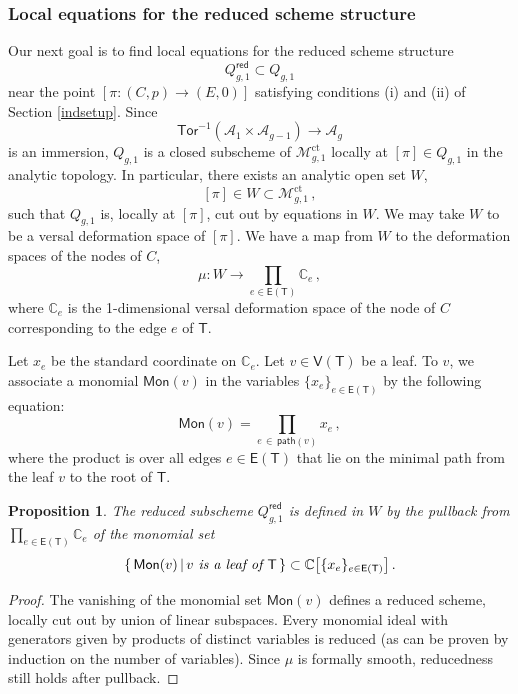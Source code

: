 \documentclass[11pt]{amsart}
\newtheorem{prop}[thm]{Proposition}
\theoremstyle{definition}
\newcommand{\M}{\mathcal{M}}
\newcommand{\A}{\mathcal{A}}
\DeclareMathOperator{\ct}{ct}
\newcommand{\Tor}{\mathsf{Tor}}
\begin{document}
{\subsubsection{Local equations for the reduced scheme structure}
Our next goal is to find local equations for the reduced scheme structure $$Q_{g,1}^{\mathsf{red}}\subset 
Q_{g,1}$$ 
near
the point $[\pi: (C,p) \rightarrow (E,0)]$ satisfying conditions (i) and (ii) of Section \ref{indsetup}. 
Since 
$$\Tor^{-1}(\A_1\times \A_{g-1}) \rightarrow \A_g$$
is an immersion,
$Q_{g,1}$ is a closed subscheme of $\M_{g,1}^{\ct}$
locally at 
$[\pi]\in Q_{g,1}$ in the analytic topology.
In particular, there exists an analytic open set $W$,
$$[\pi]\in W\subset \M_{g,1}^{\ct}\, ,$$
such that $Q_{g,1}$ is, locally at $[\pi]$, cut out
by equations in $W$.
We may take $W$ to be
a versal deformation space of 
$[\pi]$. We have a map from $W$ to the deformation spaces of the nodes of $C$, 
$$\mu:W \rightarrow \prod_{e\in \mathsf{E}(\mathsf{T})} \mathbb{C}_e\,,$$
where $\mathbb{C}_e$ is the 1-dimensional versal deformation
space of the node of $C$ corresponding to the edge $e$ of $\mathsf{T}$.

Let $x_e$ be the standard coordinate on $\mathbb{C}_e$.
Let $v\in \mathsf{V}(\mathsf{T})$ be a leaf. To $v$, we associate
a monomial $\mathsf{Mon}(v)$ in the variables $\{x_e\}_{e\in \mathsf{E}(\mathsf{T})}$
by the following equation:
$$\mathsf{Mon}(v) = \prod_{e\, \in\,  \mathsf{path}(v)} x_e\, ,$$
where the product is over all edges $e\in \mathsf{E}(\mathsf{T})$ that lie on the minimal 
path from the leaf $v$ to the root of $\mathsf{T}$.

\begin{prop} \label{red999} The reduced subscheme $Q^{\mathsf{red}}_{g,1}$ is defined in $W$ by the pullback
from $\prod_{e\in \mathsf{E}(\mathsf{T})} \mathbb{C}_e$
of
the 
monomial set
$$\{ \, \mathsf{Mon}(v) \, | \,  \text{\em $v$ is a leaf of $\mathsf{T}$}\, \} \subset \mathbb{C}\big[\{x_e\}_{e\in \mathsf{E}(\mathsf{T})}\big]\, .$$
    \end{prop}

    \begin{proof} The vanishing of the monomial set $\mathsf{Mon}(v)$ defines a reduced scheme, locally cut out by union of linear subspaces.   Every monomial ideal with  generators given by products of distinct variables is reduced (as can be proven by induction on the number of variables). Since $\mu$ is formally smooth,
reducedness still holds after pullback. 
\end{proof}


}
\end{document}
